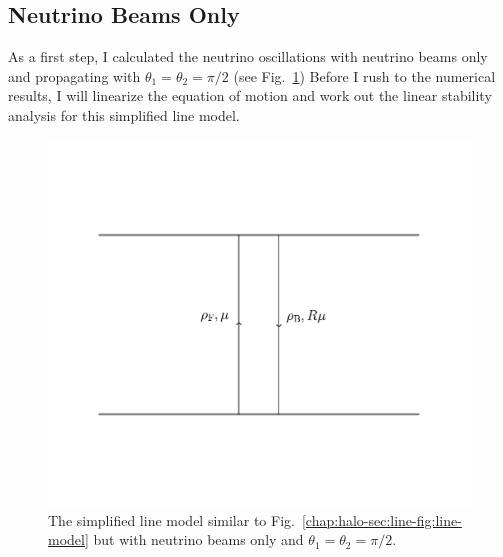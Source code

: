 




\subsection{\label{chap:halo-sec:line-sym}Neutrino Beams Only}

As a first step, I calculated the neutrino oscillations with neutrino beams only and propagating with $\theta_1=\theta_2=\pi/2$ (see Fig.~\ref{chap:halo-sec:line-fig:line-model-simplified}) Before I rush to the numerical results, I will linearize the equation of motion and work out the linear stability analysis for this simplified line model.

\begin{figure}
    \centering
    \includegraphics[width=\textwidth]{chapters/assets/halo/halo-line-model-single-beam}
    \caption{The simplified line model similar to Fig.~\ref{chap:halo-sec:line-fig:line-model} but with neutrino beams only and $\theta_1=\theta_2=\pi/2$.}
    \label{chap:halo-sec:line-fig:line-model-simplified}
\end{figure}

